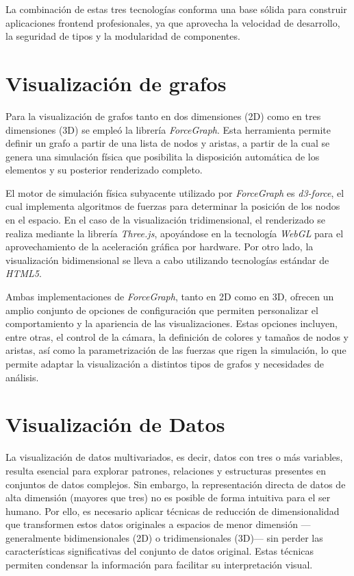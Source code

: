 \documentclass{article}
\begin{document}
La combinación de estas tres tecnologías conforma una base sólida para construir aplicaciones frontend profesionales, ya que aprovecha la velocidad de desarrollo, la seguridad de tipos y la modularidad de componentes.

\section{Visualización de grafos}
Para la visualización de grafos tanto en dos dimensiones (2D) como en tres dimensiones (3D) se empleó la librería \textit{ForceGraph}. Esta herramienta permite definir un grafo a partir de una lista de nodos y aristas, a partir de la cual se genera una simulación física que posibilita la disposición automática de los elementos y su posterior renderizado completo.

El motor de simulación física subyacente utilizado por \textit{ForceGraph} es \textit{d3-force}, el cual implementa algoritmos de fuerzas para determinar la posición de los nodos en el espacio. En el caso de la visualización tridimensional, el renderizado se realiza mediante la librería \textit{Three.js}, apoyándose en la tecnología \textit{WebGL} para el aprovechamiento de la aceleración gráfica por hardware. Por otro lado, la visualización bidimensional se lleva a cabo utilizando tecnologías estándar de \textit{HTML5}.

Ambas implementaciones de \textit{ForceGraph}, tanto en 2D como en 3D, ofrecen un amplio conjunto de opciones de configuración que permiten personalizar el comportamiento y la apariencia de las visualizaciones. Estas opciones incluyen, entre otras, el control de la cámara, la definición de colores y tamaños de nodos y aristas, así como la parametrización de las fuerzas que rigen la simulación, lo que permite adaptar la visualización a distintos tipos de grafos y necesidades de análisis.

\section{Visualización de Datos}

La visualización de datos multivariados, es decir, datos con tres o más variables, resulta esencial para explorar patrones, relaciones y estructuras presentes en conjuntos de datos complejos. Sin embargo, la representación directa de datos de alta dimensión (mayores que tres) no es posible de forma intuitiva para el ser humano. Por ello, es necesario aplicar técnicas de reducción de dimensionalidad que transformen estos datos originales a espacios de menor dimensión —generalmente bidimensionales (2D) o tridimensionales (3D)— sin perder las características significativas del conjunto de datos original. Estas técnicas permiten condensar la información para facilitar su interpretación visual.
\end{document}
